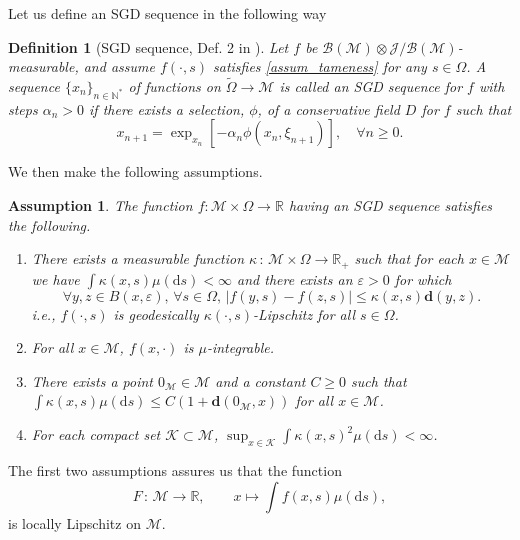 \documentclass{article}
\newtheorem{assumption}{Assumption}
\newtheorem{definition}{Definition}
\newcommand{\CM}{\mathcal{M}}
\newcommand{\BR}{\mathbb{R}}
\newcommand{\BN}{\mathbb{N}}
\newcommand{\rd}{\mathrm{d}}
\newcommand{\bd}{\mathbf{d}}
\begin{document}
Let us define an SGD sequence in the following way
\begin{definition}[SGD sequence, Def. 2 in \cite{bianchi2022convergence}]
    Let $f$ be $\mathcal{B}(\CM)\otimes\mathcal{J}/\mathcal{B}(\CM)$-measurable, and assume $f(\cdot,s)$ satisfies \ref{assum_tameness} for any $s\in\Omega$. A sequence $\{x_n\}_{n\in\BN^*}$ of functions on $\tilde \Omega\to\CM$ is called an SGD sequence for $f$ with steps $\alpha_n>0$ if there exists a selection, $\phi$, of a conservative field $D$ for $f$ such that 
    \begin{equation}\label{eq:sgdseq}
        x_{n+1}=\exp_{x_n}\left[-\alpha_n \phi(x_n,\xi_{n+1})\right],\quad \forall n\geq 0.
    \end{equation}
\end{definition}

We then make the following assumptions.
\begin{assumption}\label{assum_f}
    The function $f:\CM\times\Omega\to\BR$ having an SGD sequence satisfies the following. 
    
    \begin{enumerate}
        \item There exists a measurable function $\kappa\,:\,\CM\times\Omega\to\BR_+$ such that for each $x\in\CM$ we have $\int \kappa(x,s)\mu(\rd s)<\infty$ and there exists an $\varepsilon>0$ for which
        \begin{equation}
            \forall y,z\in B(x,\varepsilon),\,\forall s\in\Omega, \,|f(y,s)-f(z,s)|\leq \kappa(x,s)\bd(y,z).
        \end{equation}
        i.e., $f(\cdot,s)$ is geodesically $\kappa(\cdot,s)$-Lipschitz for all $s\in\Omega$.

        \item For all $x\in\CM$, $f(x,\cdot)$ is $\mu$-integrable. 

        \item There exists a point $0_{\CM}\in\mathcal{M}$ and a constant $C\geq 0$ such that $\int \kappa(x,s)\mu(\rd s)\le C(1+\bd(0_{\CM},x))$ for all $x\in\CM$. 

        \item For each compact set $\mathcal{K}\subset \CM$, $\sup_{x\in\mathcal{K}}\int \kappa(x,s)^2\mu(\rd s)<\infty$. 

    \end{enumerate}
\end{assumption}


The first two assumptions assures us that the function
\begin{equation}
    F\,:\,\CM\to\BR,\qquad x\mapsto \int f(x,s)\mu(\rd s),
\end{equation}
is locally Lipschitz on $\CM$.
\end{document}
